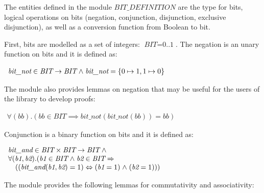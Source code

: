 \documentclass[a4paper]{llncs}
\begin{document}
The entities defined in the module $\textit{BIT\_DEFINITION}$ are the
type for bits, logical operations on bits (negation, conjunction,
disjunction, exclusive disjunction), as well as a conversion function
from Boolean to bit.

First, bits are modelled as a set of integers: $\textit{BIT} =
\textit{0..1}$. The negation is an unary function on bits and it is
defined as:



$
\begin{array}{l}
\textit{bit\_not}  \in  \textit{BIT}  \rightarrow  \textit{BIT}  \mathrel{\wedge} 
\textit{bit\_not} \rm = \rm \{ \rm 0  \mapsto  \rm 1 , \rm 1  \mapsto  \rm 0 \rm \}
\end{array}
$



The module also provides lemmas on negation that may be useful for the
users of the library to develop proofs:

$
\begin{array}{l}
\forall (\textit{bb}).(\textit{bb} \in \textit{BIT} \implies \textit{bit\_not}(\textit{bit\_not}(\textit{bb})) = \textit{bb})
\end{array}
$

Conjunction is a binary function on bits and it is defined as:

$
\begin{array}{l}
\textit{bit\_and} \in \textit{BIT} \times \textit{BIT} \fun \textit{BIT} \land \\
\forall (\textit{b1}, \textit{b2}).(\textit{b1}  \in \textit{BIT}  \land \textit{b2} \in \textit{BIT} \implies \\
\quad ((\textit{bit\_and}(\textit{b1}, \textit{b2}) = 1) \iff (\textit{b1} = 1)  \land  (\textit{b2} = 1)))
\end{array}
$

The module provides the following lemmas for commutativity and associativity:
\end{document}
